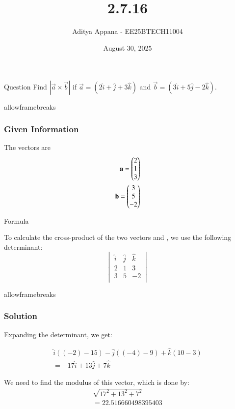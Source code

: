 \documentclass{beamer}
\title %
{2.7.16}
\date{August 30, 2025}
\author %
{Aditya Appana - EE25BTECH11004}
\begin{document}
\frame{\titlepage}
\begin{frame}{Question}
Find $|\vec{a}\times \vec{b}|$ if $\vec{a} = (2\hat{i} +\hat{j} +3\hat{k})$ and  $ \vec{b}=(3\hat{i} + 5\hat{j} - 2\hat{k})$.
\end{frame}
\begin{frame}{allowframebreaks}
\frametitle{Given Information}

    \centering
    
    \label{tab:parameters}
    The vectors are
\begin{align} 
\mathbf{a} = \begin{pmatrix}2\\1\\3\end{pmatrix}\\
\mathbf{b} = \begin{pmatrix}3\\5\\-2\end{pmatrix}
\end{align}
\end{frame}

\begin{frame}{Formula}

To calculate the cross-product of the two vectors  and , we use the following determinant:\\

\[
\begin{vmatrix}
\hat{i} & \hat{j} & \hat{k}\\
2&1&3\\
3&5&-2\\
\end{vmatrix}
\]
\vspace{1cm}

\end{frame}

\begin{frame}{allowframebreaks}
\frametitle{Solution}

Expanding the determinant, we get: 

\begin{align}
\hat{i}((-2) - 15) - \hat{j}((-4) - 9) + \hat{k}(10-3)\\
= -17\hat{i} + 13\hat{j} + 7\hat{k}
\end{align}

We need to find the modulus of this vector, which is done by:
\begin{align}
\sqrt{17^2+13^2+7^2} \\
=22.516660498395403
\end{align}


\end{frame}
\end{document}
